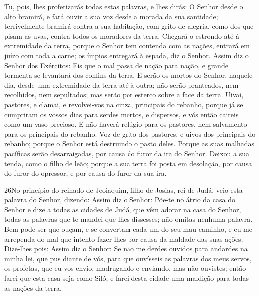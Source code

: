 Tu, pois, lhes profetizarás todas estas palavras, e lhes dirás: O
Senhor desde o alto bramirá, e fará ouvir a sua voz desde a morada
da sua santidade; terrivelmente bramirá contra a sua habitação, com
grito de alegria, como dos que pisam as uvas, contra todos os
moradores da terra. Chegará o estrondo até à extremidade da
terra, porque o Senhor tem contenda com as nações, entrará em juízo
com toda a carne; os ímpios entregará à espada, diz o Senhor.
Assim diz o Senhor dos Exércitos: Eis que o mal passa de
nação para nação, e grande tormenta se levantará dos confins da
terra. E serão os mortos do Senhor, naquele dia, desde uma
extremidade da terra até à outra; não serão pranteados, nem
recolhidos, nem sepultados; mas serão por esterco sobre a face da
terra. Uivai, pastores, e clamai, e revolvei-vos na cinza,
principais do rebanho, porque já se cumpriram os vossos dias para
serdes mortos, e dispersos, e vós então caireis como um vaso
precioso. E não haverá refúgio para os pastores, nem
salvamento para os principais do rebanho. Voz de grito dos
pastores, e uivos dos principais do rebanho; porque o Senhor está
destruindo o pasto deles. Porque as suas malhadas pacíficas
serão desarraigadas, por causa do furor da ira do Senhor.
Deixou a sua tenda, como o filho de leão; porque a sua terra
foi posta em desolação, por causa do furor do opressor, e por causa
do furor da sua ira.

\medskip

\lettrine{26} No princípio do reinado de Jeoiaquim, filho de
Josias, rei de Judá, veio esta palavra do Senhor, dizendo: Assim
diz o Senhor: Põe-te no átrio da casa do Senhor e dize a todas as
cidades de Judá, que vêm adorar na casa do Senhor, todas as palavras
que te mandei que lhes dissesses; não omitas nenhuma palavra.
Bem pode ser que ouçam, e se convertam cada um do seu mau
caminho, e eu me arrependa do mal que intento fazer-lhes por causa
da maldade das suas ações. Dize-lhes pois: Assim diz o Senhor:
Se não me derdes ouvidos para andardes na minha lei, que pus diante
de vós, para que ouvísseis as palavras dos meus servos, os
profetas, que eu vos envio, madrugando e enviando, mas não ouvistes;
então farei que esta casa seja como Siló, e farei desta cidade
uma maldição para todas as nações da terra.

